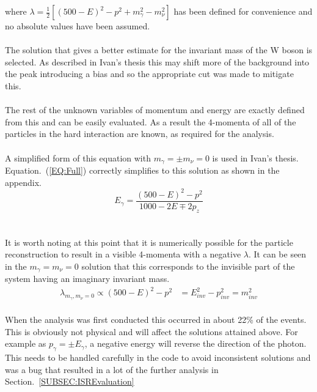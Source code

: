 where $ {\lambda} = \frac{1}{2}[{(500 - E)}^2 - {p}^{2} + {m}_{\gamma}^{2} - {m}_{\nu}^{2}] $ has been defined for convenience and no absolute values have been assumed.
\\\\
The solution that gives a better estimate for the invariant mass of the W boson is selected.  As described in Ivan's thesis \cite{IvanMarchesini} this may shift more of the background into the peak introducing a bias and so the appropriate cut was made to mitigate this.
\\\\
The rest of the unknown variables of momentum and energy are exactly defined from this and can be easily evaluated. As a result the 4-momenta of all of the particles in the hard interaction are known, as required for the analysis.
\\\\
A simplified form of this equation with ${m}_{\gamma}= \pm {m}_{\nu} = 0$ is used in Ivan's thesis. Equation.~(\ref{EQ:Full}) correctly simplifies to this solution as shown in the appendix.
 \begin{equation}
     \label{EQ:Simple}
  {E}_{\gamma} = \frac{ {(500 - E)}^2 - {p}^{2}}{1000 -2 E  \mp 2{p}_{z}}
\end{equation}
\\\\
 It is worth noting at this point that it is numerically possible for the particle reconstruction to result in a visible 4-momenta with a negative $\lambda$. It can be seen in the ${m}_{\gamma} = {m}_{\nu} =0$ solution that this corresponds to the invisible part of the system having an imaginary invariant mass.
\\
 \begin{align}
     \label{EQ:invariantMassNegative}
     {\lambda}_{{m}_{\gamma}, {m}_{\nu} = 0} \propto {(500 - E)}^2 - {p}^{2} &= {E}_{inv}^2 - {p}_{inv}^{2} = {m}_{inv}^2
 \end{align}
\\
When the analysis was first conducted this occurred in about 22\% of the events. This is obviously not physical and will affect the solutions attained above. For example as ${p}_{\gamma}= \pm {E}_{\gamma}$, a negative energy will reverse the direction of the photon. This needs to be handled carefully in the code to avoid inconsistent solutions and was a bug that resulted in a lot of the further analysis in Section.~\ref{SUBSEC:ISREvaluation}
\\\\
